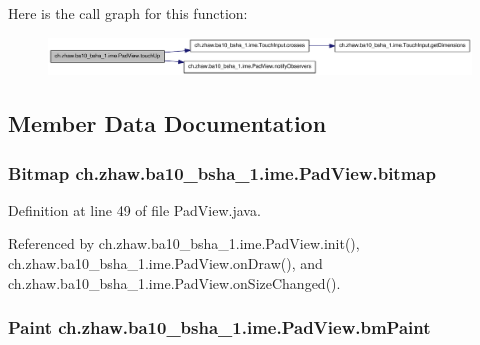 Here is the call graph for this function:\nopagebreak
\begin{figure}[H]
\begin{center}
\leavevmode
\includegraphics[width=411pt]{classch_1_1zhaw_1_1ba10__bsha__1_1_1ime_1_1PadView_ac4eee83441a5d6f625582acf5a1d7d03_cgraph}
\end{center}
\end{figure}


\subsection{Member Data Documentation}
\hypertarget{classch_1_1zhaw_1_1ba10__bsha__1_1_1ime_1_1PadView_aa24b63a808cf4edc3dc57a42b5d71892}{
\subsubsection[{bitmap}]{\setlength{\rightskip}{0pt plus 5cm}Bitmap {\bf ch.zhaw.ba10\_\-bsha\_\-1.ime.PadView.bitmap}}}
\label{classch_1_1zhaw_1_1ba10__bsha__1_1_1ime_1_1PadView_aa24b63a808cf4edc3dc57a42b5d71892}


Definition at line 49 of file PadView.java.

Referenced by ch.zhaw.ba10\_\-bsha\_\-1.ime.PadView.init(), ch.zhaw.ba10\_\-bsha\_\-1.ime.PadView.onDraw(), and ch.zhaw.ba10\_\-bsha\_\-1.ime.PadView.onSizeChanged().\hypertarget{classch_1_1zhaw_1_1ba10__bsha__1_1_1ime_1_1PadView_a9113cabd4a9c66b85a2224ff87c7756a}{
\subsubsection[{bmPaint}]{\setlength{\rightskip}{0pt plus 5cm}Paint {\bf ch.zhaw.ba10\_\-bsha\_\-1.ime.PadView.bmPaint}}}
\label{classch_1_1zhaw_1_1ba10__bsha__1_1_1ime_1_1PadView_a9113cabd4a9c66b85a2224ff87c7756a}


